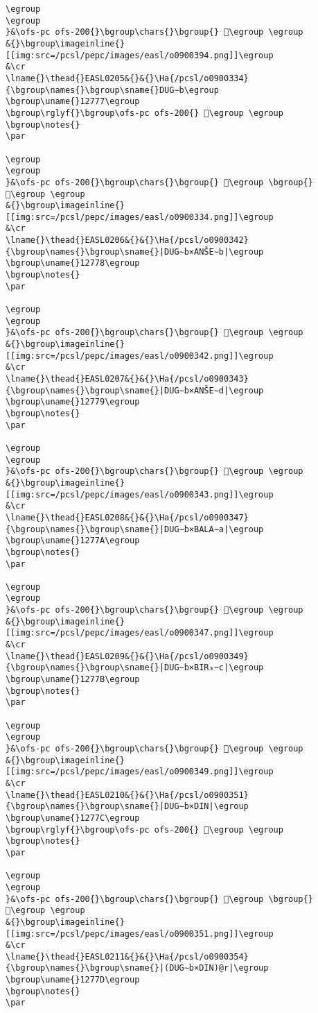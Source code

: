 \begin{verbatim}
\egroup
\egroup
}&\ofs-pc ofs-200{}\bgroup\chars{}\bgroup{} 𒝳\egroup \egroup
&{}\bgroup\imageinline{}[[img:src=/pcsl/pepc/images/easl/o0900394.png]]\egroup
&\cr
\lname{}\thead{}EASL0205&{}&{}\Ha{/pcsl/o0900334}{\bgroup\names{}\bgroup\sname{}DUG∼b\egroup
\bgroup\uname{}12777\egroup
\bgroup\rglyf{}\bgroup\ofs-pc ofs-200{} 𒝷\egroup \egroup
\bgroup\notes{}
\par 

\egroup
\egroup
}&\ofs-pc ofs-200{}\bgroup\chars{}\bgroup{} 𒞭\egroup \bgroup{} 𒝷\egroup \egroup
&{}\bgroup\imageinline{}[[img:src=/pcsl/pepc/images/easl/o0900334.png]]\egroup
&\cr
\lname{}\thead{}EASL0206&{}&{}\Ha{/pcsl/o0900342}{\bgroup\names{}\bgroup\sname{}|DUG∼b×ANŠE∼b|\egroup
\bgroup\uname{}12778\egroup
\bgroup\notes{}
\par 

\egroup
\egroup
}&\ofs-pc ofs-200{}\bgroup\chars{}\bgroup{} 𒝸\egroup \egroup
&{}\bgroup\imageinline{}[[img:src=/pcsl/pepc/images/easl/o0900342.png]]\egroup
&\cr
\lname{}\thead{}EASL0207&{}&{}\Ha{/pcsl/o0900343}{\bgroup\names{}\bgroup\sname{}|DUG∼b×ANŠE∼d|\egroup
\bgroup\uname{}12779\egroup
\bgroup\notes{}
\par 

\egroup
\egroup
}&\ofs-pc ofs-200{}\bgroup\chars{}\bgroup{} 𒝹\egroup \egroup
&{}\bgroup\imageinline{}[[img:src=/pcsl/pepc/images/easl/o0900343.png]]\egroup
&\cr
\lname{}\thead{}EASL0208&{}&{}\Ha{/pcsl/o0900347}{\bgroup\names{}\bgroup\sname{}|DUG∼b×BALA∼a|\egroup
\bgroup\uname{}1277A\egroup
\bgroup\notes{}
\par 

\egroup
\egroup
}&\ofs-pc ofs-200{}\bgroup\chars{}\bgroup{} 𒝺\egroup \egroup
&{}\bgroup\imageinline{}[[img:src=/pcsl/pepc/images/easl/o0900347.png]]\egroup
&\cr
\lname{}\thead{}EASL0209&{}&{}\Ha{/pcsl/o0900349}{\bgroup\names{}\bgroup\sname{}|DUG∼b×BIR₃∼c|\egroup
\bgroup\uname{}1277B\egroup
\bgroup\notes{}
\par 

\egroup
\egroup
}&\ofs-pc ofs-200{}\bgroup\chars{}\bgroup{} 𒝻\egroup \egroup
&{}\bgroup\imageinline{}[[img:src=/pcsl/pepc/images/easl/o0900349.png]]\egroup
&\cr
\lname{}\thead{}EASL0210&{}&{}\Ha{/pcsl/o0900351}{\bgroup\names{}\bgroup\sname{}|DUG∼b×DIN|\egroup
\bgroup\uname{}1277C\egroup
\bgroup\rglyf{}\bgroup\ofs-pc ofs-200{} 𒝼\egroup \egroup
\bgroup\notes{}
\par 

\egroup
\egroup
}&\ofs-pc ofs-200{}\bgroup\chars{}\bgroup{} 𒞯\egroup \bgroup{} 𒝼\egroup \egroup
&{}\bgroup\imageinline{}[[img:src=/pcsl/pepc/images/easl/o0900351.png]]\egroup
&\cr
\lname{}\thead{}EASL0211&{}&{}\Ha{/pcsl/o0900354}{\bgroup\names{}\bgroup\sname{}|(DUG∼b×DIN)@r|\egroup
\bgroup\uname{}1277D\egroup
\bgroup\notes{}
\par 


\end{verbatim}
